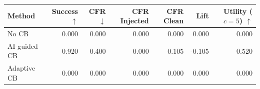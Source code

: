 \begin{tabular}{lrrrrrr}
\toprule
Method & Success $\uparrow$ & CFR $\downarrow$ & CFR Injected & CFR Clean & Lift & Utility ($c=5$) $\uparrow$ \\
\midrule
No CB & 0.000 & 0.000 & 0.000 & 0.000 & 0.000 & 0.000 \\
AI-guided CB & 0.920 & 0.400 & 0.000 & 0.105 & -0.105 & 0.520 \\
Adaptive CB & 0.000 & 0.000 & 0.000 & 0.000 & 0.000 & 0.000 \\
\bottomrule
\end{tabular}

